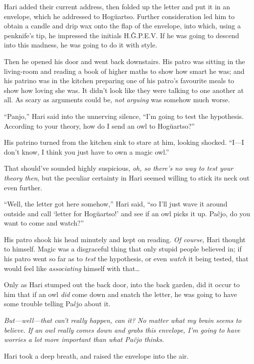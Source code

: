 Hari added their current address, then folded up the letter and put it in an envelope, which he addressed to Hogŭartso. Further consideration led him to obtain a candle and drip wax onto the flap of the envelope, into which, using a penknife’s tip, he impressed the initials H.Ĝ.P.E.V\@. If he was going to descend into this madness, he was going to do it with style.

Then he opened his door and went back downstairs. His patro was sitting in the living-room and reading a book of higher maths to show how smart he was; and his patrino was in the kitchen preparing one of his patro’s favourite meals to show how loving she was. It didn’t look like they were talking to one another at all. As scary as arguments could be, \emph{not arguing} was somehow much worse.

“Panjo,” Hari said into the unnerving silence, “I’m going to test the hypothesis. According to your theory, how do I send an owl to Hogŭartso?”

His patrino turned from the kitchen sink to stare at him, looking shocked. “I—I don’t know, I think you just have to own a magic owl.”

That should’ve sounded highly suspicious, \emph{oh, so there’s no way to test your theory then}, but the peculiar certainty in Hari seemed willing to stick its neck out even further.

“Well, the letter got here somehow,” Hari said, “so I’ll just wave it around outside and call ‘letter for Hogŭartso!’ and see if an owl picks it up. Paĉjo, do you want to come and watch?”

His patro shook his head minutely and kept on reading. \emph{Of course,} Hari thought to himself. Magic was a disgraceful thing that only stupid people believed in; if his patro went so far as to \emph{test} the hypothesis, or even \emph{watch} it being tested, that would feel like \emph{associating} himself with that…

Only as Hari stumped out the back door, into the back garden, did it occur to him that if an owl \emph{did} come down and snatch the letter, he was going to have some trouble telling Paĉjo about it.

\emph{But—well—that can’t \emph{really} happen, can it? No matter what my brain seems to believe. If an owl really comes down and grabs this envelope, I’m going to have worries a lot more important than what Paĉjo thinks.}

Hari took a deep breath, and raised the envelope into the air.

